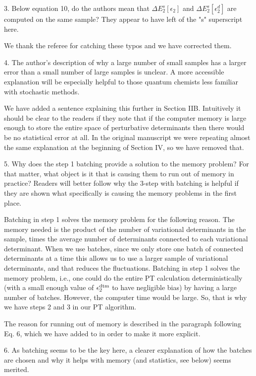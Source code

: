 \documentclass[
preprint,
onecolumn,
 superscriptaddress,
 amsmath,amssymb,
 aps,
]{revtex4-1}
\begin{document}
\vskip 5mm {\color{blue}
3. Below equation 10, do the authors mean that $\Delta E_2^s[\epsilon_2]$ and
$\Delta E_2^s[\epsilon_2^d]$ are computed on the same sample? They appear to have left of the
"s" superscript here.
}\color{black}

We thank the referee for catching these typos and we have corrected them.

\vskip 5mm {\color{blue}
4. The author's description of why a large number of small samples has a larger error than
a small number of large samples is unclear. A more accessible explanation will be especially
helpful to those quantum chemists less familiar with stochastic methods.
}\color{black}

We have added a sentence explaining this further in Section IIB.  Intuitively it should be clear to the readers
if they note that if the computer memory is large enough to store the entire space of perturbative
determinants then there would be no statistical error at all.
In the original manuscript we were repeating almost the same explanation at the beginning of
Section IV, so we have removed that.

\vskip 5mm {\color{blue}
5. Why does the step 1 batching provide a solution to the memory problem? For that matter,
what object is it that is causing them to run out of memory in practice? Readers will better
follow why the 3-step with batching is helpful if they are shown what specifically is causing
the memory problems in the first place.
}\color{black}

Batching in step 1 solves the memory problem for the following reason.  The memory needed
is the product of the number of variational determinants in the sample, times the average number
of determinants connected to each variational determinant.  When we use batches, since we only
store one batch of connected determinants at a time this allows us to use a larger sample of
variational determinants, and that reduces the fluctuations.
Batching in step 1 solves the memory problem, i.e., one could do the entire PT calculation
deterministically (with a small enough value of $\epsilon_2^{\rm dtm}$ to have negligible bias)
by having a large number of batches.  However, the computer time would be
large.  So, that is why we have steps 2 and 3 in our PT algorithm.

The reason for running out of memory is described in the paragraph following Eq. 6, which we
have added to in order to make it more explicit.

\vskip 5mm {\color{blue}
6. As batching seems to be the key here, a clearer explanation of how the batches are chosen
and why it helps with memory (and statistics, see below) seems merited.
}\color{black}
\end{document}
